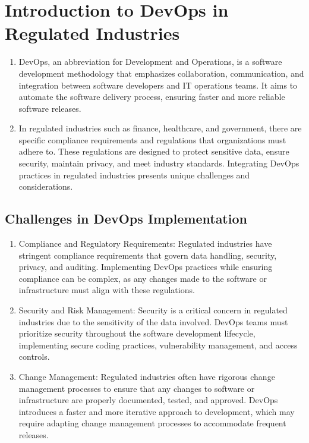 \chapter{Introduction to DevOps in Regulated Industries}

\begin{enumerate}
    \item DevOps, an abbreviation for Development and Operations, is a software development methodology that emphasizes collaboration, communication, and integration between software developers and IT operations teams. It aims to automate the software delivery process, ensuring faster and more reliable software releases.

    \item In regulated industries such as finance, healthcare, and government, there are specific compliance requirements and regulations that organizations must adhere to. These regulations are designed to protect sensitive data, ensure security, maintain privacy, and meet industry standards. Integrating DevOps practices in regulated industries presents unique challenges and considerations.
\end{enumerate}

\section*{Challenges in DevOps Implementation}

\begin{enumerate}
    \item Compliance and Regulatory Requirements: Regulated industries have stringent compliance requirements that govern data handling, security, privacy, and auditing. Implementing DevOps practices while ensuring compliance can be complex, as any changes made to the software or infrastructure must align with these regulations.

    \item Security and Risk Management: Security is a critical concern in regulated industries due to the sensitivity of the data involved. DevOps teams must prioritize security throughout the software development lifecycle, implementing secure coding practices, vulnerability management, and access controls.

    \item Change Management: Regulated industries often have rigorous change management processes to ensure that any changes to software or infrastructure are properly documented, tested, and approved. DevOps introduces a faster and more iterative approach to development, which may require adapting change management processes to accommodate frequent releases.
\end{enumerate}

